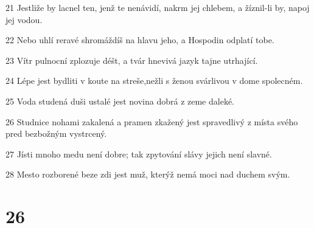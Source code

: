 \par 21 Jestliže by lacnel ten, jenž te nenávidí, nakrm jej chlebem, a žíznil-li by, napoj jej vodou.
\par 22 Nebo uhlí reravé shromáždíš na hlavu jeho, a Hospodin odplatí tobe.
\par 23 Vítr pulnocní zplozuje déšt, a tvár hnevivá jazyk tajne utrhající.
\par 24 Lépe jest bydliti v koute na streše,nežli s ženou svárlivou v dome spolecném.
\par 25 Voda studená duši ustalé jest novina dobrá z zeme daleké.
\par 26 Studnice nohami zakalená a pramen zkažený jest spravedlivý z místa svého pred bezbožným vystrcený.
\par 27 Jísti mnoho medu není dobre; tak zpytování slávy jejich není slavné.
\par 28 Mesto rozborené beze zdi jest muž, kterýž nemá moci nad duchem svým.

\chapter{26}

